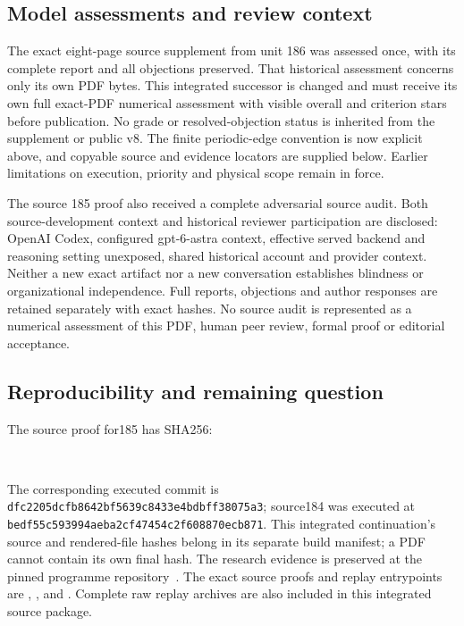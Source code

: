 \subsection{Model assessments and review context}
The exact eight-page source supplement from unit 186 was assessed once,
with its complete report and all objections preserved. That historical
assessment concerns only its own PDF bytes. This integrated successor is
changed and must receive its own full exact-PDF numerical assessment with
visible overall and criterion stars before publication. No grade or
resolved-objection status is inherited from the supplement or public v8.
The finite periodic-edge convention is now explicit above, and copyable
source and evidence locators are supplied below. Earlier limitations on
execution, priority and physical scope remain in force.

The source 185 proof also received a complete adversarial source audit.
Both source-development context and historical reviewer participation are
disclosed: OpenAI Codex, configured gpt-6-astra context, effective served
backend and reasoning setting unexposed, shared historical account and
provider context. Neither a new exact artifact nor a new conversation
establishes blindness or organizational independence. Full reports,
objections and author responses are retained separately with exact hashes.
No source audit is represented as a numerical assessment of this PDF,
human peer review, formal proof or editorial acceptance.

\subsection{Reproducibility and remaining question}
The source proof for185 has SHA256:\par\nopagebreak
\noindent\begin{minipage}{\linewidth}\begin{center}\small\texttt{}\\
\texttt{}\end{center}\end{minipage}\par
The corresponding executed commit is
\texttt{dfc2205dcfb8642bf5639c8433e4bdbff38075a3};
source184 was executed at
\texttt{bedf55c593994aeba2cf47454c2f608870ecb871}.
This integrated continuation's source and rendered-file hashes belong in its separate
build manifest; a PDF cannot contain its own final hash. The research
evidence is preserved at the pinned programme repository~\cite{lg:evidence}.
The exact source proofs and replay entrypoints are
,
,
 and
.
Complete raw replay archives are also included in this integrated source package.


